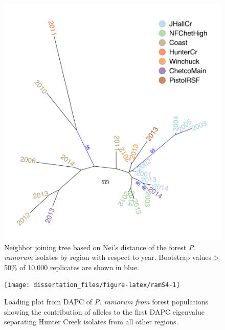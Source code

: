 \documentclass[double,11pt]{beavtex}
\begin{document}
  \begin{figure}
  
  {\centering \includegraphics[width=0.8\linewidth]{figure/phytopathology/figureS3} 
  
  }
  
  \caption[Neighbor joining tree based on Nei's distance of the forest \emph{P.
  ramorum} isolates by region with respect to year.]{Neighbor joining tree based on Nei's distance of the forest \emph{P.
  ramorum} isolates by region with respect to year. Bootstrap values
  \textgreater{} 50\% of 10,000 replicates are shown in blue.}\label{fig:ramS3}
  \end{figure}
  
  \begin{figure}
  
  {\centering \texttt{[image: dissertation\_files/figure-latex/ramS4-1]} 
  
  }
  
  \caption[Loading plot from DAPC of \emph{P. ramorum from} forest populations
  showing the contribution of alleles to the first DAPC eigenvalue
  separating Hunter Creek isolates from all other regions.]{Loading plot from DAPC of \emph{P. ramorum from} forest populations
  showing the contribution of alleles to the first DAPC eigenvalue
  separating Hunter Creek isolates from all other regions.}\label{fig:ramS4}
  \end{figure}
  
\end{document}
